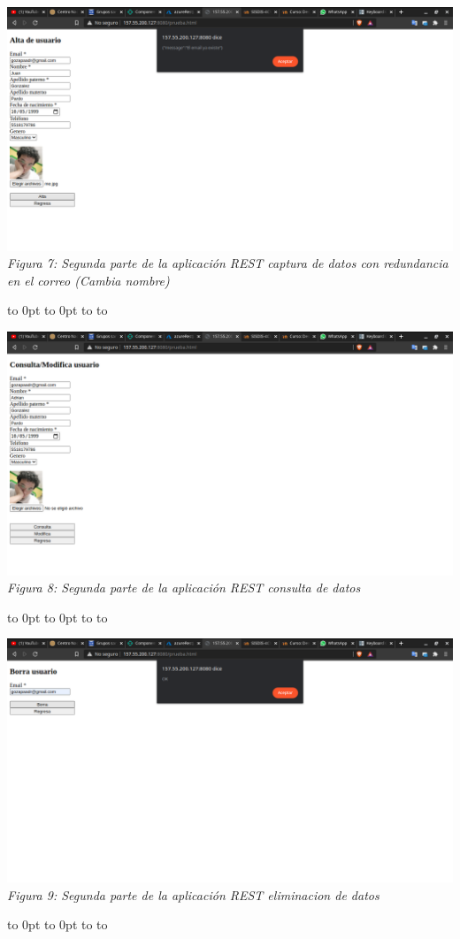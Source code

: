 \documentclass[10pt,executivepaper]{article}
\def\fillandplacepagenumber{%
 \par\pagestyle{empty}%
 \vbox to 0pt{\vss}\vfill
 \vbox to 0pt{\baselineskip0pt
   \hbox to\linewidth{\hss}%
   \baselineskip\footskip
   \hbox to\linewidth{%
     \hfil\thepage\hfil}\vss}}
\begin{document}
\begin{center}
\begin{landscape}
    \includegraphics[scale=0.45]{imgs/otros-valores.png}
    \\\textit{Figura 7: Segunda parte de la aplicación REST captura de datos con redundancia en el correo (Cambia nombre)}
    \fillandplacepagenumber

    \includegraphics[scale=0.45]{imgs/consulta.png}
    \\\textit{Figura 8: Segunda parte de la aplicación REST consulta de datos}
    \fillandplacepagenumber

    \includegraphics[scale=0.45]{imgs/eliminacion.png}
    \\\textit{Figura 9: Segunda parte de la aplicación REST eliminacion de datos}
    \fillandplacepagenumber


\end{landscape}
\end{center}
\end{document}
